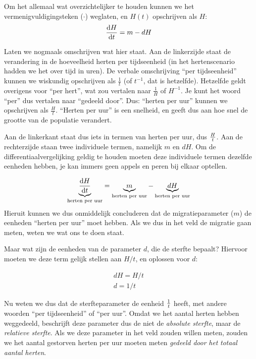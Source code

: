 \documentclass[
  a4paper,
]{scrbook}
\theoremstyle{definition}
\theoremstyle{remark}
\begin{document}
Om het allemaal wat overzichtelijker te houden kunnen we het
vermenigvuldigingsteken (\(\cdot\)) weglaten, en \(H(t)\) opschrijven
als \(H\): \begin{align}
\mathchoice{\frac{\mathrm{d}H}
{\mathrm{d}t}}{\mathrm{d}H/\mathrm{d}t}
{\mathrm{d}H/\mathrm{d}t}
{\mathrm{d}H/\mathrm{d}t} = m - dH
\end{align}

Laten we nogmaals omschrijven wat hier staat. Aan de linkerzijde staat
de verandering in de hoeveelheid herten per tijdseenheid (in het
hertenscenario hadden we het over tijd in uren). De verbale omschrijving
``per tijdseenheid'' kunnen we wiskundig opschrijven als \(\frac{1}{t}\)
(of \(t^{-1}\), dat is hetzelfde). Hetzelfde geldt overigens voor ``per
hert'', wat zou vertalen naar \(\frac{1}{H}\) of \(H^{-1}\). Je kunt het
woord ``per'' dus vertalen naar ``gedeeld door''. Dus: ``herten per
uur'' kunnen we opschrijven als \(\frac{H}{t}\). ``Herten per uur'' is
een snelheid, en geeft dus aan hoe snel de grootte van de populatie
verandert.

Aan de linkerkant staat dus iets in termen van herten per uur, dus
\(H \over t\). Aan de rechterzijde staan twee individuele termen,
namelijk \(m\) en \(dH\). Om de differentiaalvergelijking geldig te
houden moeten deze individuele termen dezelfde eenheden hebben, je kan
immers geen appels en peren bij elkaar optellen.

\begin{align}
\underbrace{\mathchoice{\frac{\mathrm{d}H}
{\mathrm{d}t}}{\mathrm{d}H/\mathrm{d}t}
{\mathrm{d}H/\mathrm{d}t}
{\mathrm{d}H/\mathrm{d}t}}_{\text{herten per uur}} = \underbrace{m}_{\text{herten per uur}} - \underbrace{dH}_{\text{herten per uur}}
\end{align} Hieruit kunnen we dus onmiddelijk concluderen dat de
migratieparameter (\(m\)) de eenheden ``herten per uur'' moet hebben.
Als we dus in het veld de migratie gaan meten, weten we wat ons te doen
staat.

Maar wat zijn de eenheden van de parameter \(d\), die de sterfte
bepaalt? Hiervoor moeten we deze term gelijk stellen aan \(H/t\), en
oplossen voor \(d\):

\begin{align*}
    dH = H/t \\
    d = 1/t
\end{align*}

Nu weten we dus dat de sterfteparameter de eenheid \(1 \over t\) heeft,
met andere woorden ``per tijdseenheid'' of ``per uur''. Omdat we het
aantal herten hebben weggedeeld, beschrijft deze parameter dus de niet
de \emph{absolute sterfte}, maar de \emph{relatieve sterfte}. Als we
deze parameter in het veld zouden willen meten, zouden we het aantal
gestorven herten per uur moeten meten \emph{gedeeld door het totaal
aantal herten}.
\end{document}
